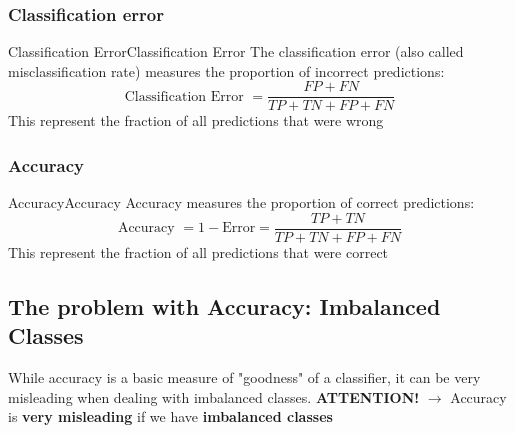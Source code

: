 \documentclass[a4paper]{article}
\theoremstyle{definition}
\begin{document}
\subsubsection{Classification error}
\begin{definition}{Classification Error}{Classification Error}
The classification error (also called misclassification rate) measures 
the proportion of incorrect predictions:
\[
  \text{Classification Error } = \frac{FP + FN}{TP + TN + FP + FN}
\]
This represent the fraction of all predictions that were wrong
\end{definition}
\subsubsection{Accuracy}
\begin{definition}{Accuracy}{Accuracy}
Accuracy measures the proportion of correct predictions:
\[
  \text{Accuracy } = 1 - \text{Error} = \frac{TP + TN}{TP + TN + FP + FN}
\]
This represent the fraction of all predictions that were correct
\end{definition}
\subsection{The problem with Accuracy: Imbalanced Classes}
While accuracy is a basic measure of "goodness" of a classifier, it can be very misleading 
when dealing with imbalanced classes.
\vspace{1em}
\noindent
\newline
\textbf{ATTENTION!} \( \rightarrow \) Accuracy is \textbf{very misleading} if we have \textbf{imbalanced classes}
\end{document}
